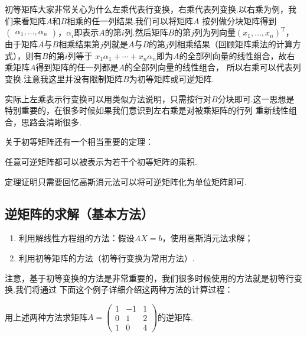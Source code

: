 初等矩阵大家非常关心为什么左乘代表行变换，右乘代表列变换.以右乘为例，我们来看矩阵$A$和$B$相乘的任一列结果.我们可以将矩阵$A$
按列做分块矩阵得到$\begin{pmatrix}\alpha_1,\ldots,\alpha_n\end{pmatrix}$，$\alpha_i$即表示$A$的第$i$列.然后矩阵$B$的第$j$列为列向量$(x_1,\ldots,x_n)^\mathrm{T}$，
由于矩阵$A$与$B$相乘结果第$j$列就是$A$与$B$的第$j$列相乘结果（回顾矩阵乘法的计算方式），则有$B$的第$i$列等于
$x_1\alpha_1+\cdots+x_n\alpha_n$即为$A$的全部列向量的线性组合，故右乘矩阵$A$得到矩阵的任一列都是$A$的全部列向量的线性组合，
所以右乘可以代表列变换.注意我这里并没有限制矩阵$B$为初等矩阵或可逆矩阵.

实际上左乘表示行变换可以用类似方法说明，只需按行对$B$分块即可.这一思想是特别重要的，在很多时候如果我们意识到左右乘是对被乘矩阵的行列
重新线性组合，思路会清晰很多.

关于初等矩阵还有一个相当重要的定理：

\begin{theorem}
    任意可逆矩阵都可以被表示为若干个初等矩阵的乘积.
\end{theorem}
定理证明只需要回忆高斯消元法可以将可逆矩阵化为单位矩阵即可.

\subsection{逆矩阵的求解（基本方法）}
\begin{enumerate}
    \item 利用解线性方程组的方法：假设$AX=b$，使用高斯消元法求解；

    \item 利用初等矩阵的方法（初等行变换为常用方法）.
\end{enumerate}

注意，基于初等变换的方法是非常重要的，我们很多时候使用的方法就是初等行变换.我们将通过
下面这个例子详细介绍这两种方法的计算过程：
\begin{example}
    用上述两种方法求矩阵$A=\begin{pmatrix}1 & -1 & 1 \\ 0 & 1 & 2 \\ 1 & 0 & 4\end{pmatrix}$的逆矩阵.
\end{example}
\begin{solution}

\end{solution}


